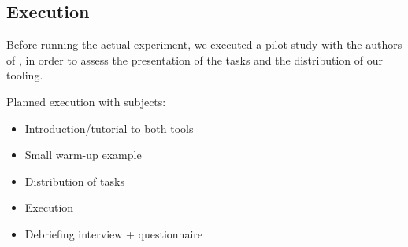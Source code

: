 \subsection{Execution}
Before running the actual experiment, we executed a pilot study with the authors of \cite{lillack2017intentions}, in order to assess the presentation of the tasks and the distribution of our tooling.

Planned execution with subjects:
\begin{itemize}
    \item Introduction/tutorial to both tools
    \item Small warm-up example
    \item Distribution of tasks
    \item Execution
    \item Debriefing interview + questionnaire
\end{itemize}